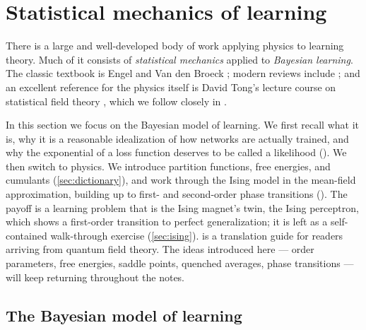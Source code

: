 \documentclass[11pt]{article}
\begin{document}



\section{Statistical mechanics of learning}
\label{sec:statmech}

There is a large and well-developed body of work applying physics to learning theory. Much of it consists of \emph{statistical mechanics} applied to \emph{Bayesian learning}. The classic textbook is Engel and Van den Broeck \cite{engel2001statistical}; modern reviews include \cite{zdeborova2016statistical,bahri2020statistical}; and an excellent reference for the physics itself is David Tong's lecture course on statistical field theory \cite{TongSFT}, which we follow closely in .

In this section we focus on the Bayesian model of learning. We first recall what it is, why it is a reasonable idealization of how networks are actually trained, and why the exponential of a loss function deserves to be called a likelihood (). We then switch to physics. We introduce partition functions, free energies, and cumulants (\cref{sec:dictionary}), and work through the Ising model in the mean-field approximation, building up to first- and second-order phase transitions (). The payoff is a learning problem that is the Ising magnet's twin, the Ising perceptron, which shows a first-order transition to perfect generalization; it is left as a self-contained walk-through exercise (\cref{sec:ising}).  is a translation guide for readers arriving from quantum field theory. The ideas introduced here --- order parameters, free energies, saddle points, quenched averages, phase transitions --- will keep returning throughout the notes.

\subsection{The Bayesian model of learning}
\label{sec:Bayes}
\end{document}

